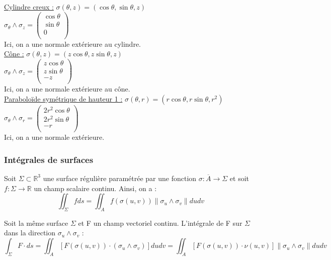 \documentclass[../main.tex]{subfiles}
\begin{document}
\quad \underline{Cylindre creux :} $\sigma(\theta, z) = (\cos{\theta}, \sin{\theta}, z)$\\
$\sigma_{\theta}\wedge \sigma_z = \begin{pmatrix}
    \cos{\theta}\\
    \sin{\theta}\\
    0\\
\end{pmatrix}$\\
Ici, on a une normale extérieure au cylindre.\\

\quad \underline{Cône :} $\sigma(\theta, z) = (z\cos{\theta}, z\sin{\theta}, z)$\\
$\sigma_{\theta}\wedge \sigma_z = \begin{pmatrix}
    z\cos{\theta}\\
    z\sin{\theta}\\
    -z\\
\end{pmatrix}$\\
Ici, on a une normale extérieure au cône.\\

\quad \underline{Paraboloïde symétrique de hauteur 1 :} $\sigma(\theta, r) = (r\cos{\theta}, r\sin{\theta}, r^2)$\\
$\sigma_{\theta}\wedge \sigma_r = \begin{pmatrix}
    2r^2\cos{\theta}\\
    2r^2\sin{\theta}\\
    -r\\
\end{pmatrix}$\\
Ici, on a une normale extérieure.\\

\subsubsection{Intégrales de surfaces}
Soit $\Sigma \subset \mathbb{R}^3$ une surface régulière paramétrée par une fonction $\sigma:\overline{A}\rightarrow \Sigma$ et soit $f:\Sigma  \rightarrow \mathbb{R}$ un champ scalaire continu. Ainsi, on a :\\
\begin{equation}
    \iint_{\Sigma} fds = \iint_A f(\sigma(u,v)) \parallel \sigma_u \wedge \sigma_v \parallel dudv
\end{equation}

Soit la même surface $\Sigma$ et F un champ vectoriel continu. L'intégrale de F sur $\Sigma$ dans la direction $\sigma_u \wedge \sigma_v$ :\\
\begin{equation}
    \int_{\Sigma} F\cdot ds = \iint_A [F(\sigma(u,v))\cdot(\sigma_u\wedge\sigma_v)] dudv = \iint_A[F(\sigma(u,v))\cdot\nu(u,v)]\parallel\sigma_u\wedge\sigma_v\parallel dudv
\end{equation}
\end{document}
